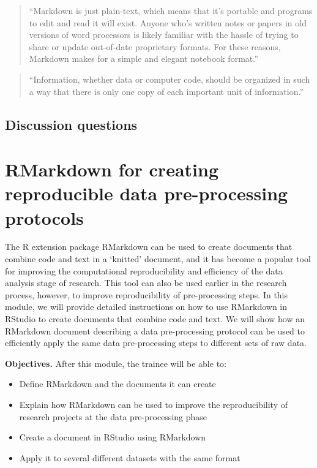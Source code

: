 \documentclass[]{tufte-book}
\providecommand{\tightlist}{%
  \setlength{\itemsep}{0pt}\setlength{\parskip}{0pt}}
\begin{document}
\begin{quote}
``Markdown is just plain-text, which means that it's portable and programs to edit
and read it will exist. Anyone who's written notes or papers in old versions of
word processors is likely familiar with the hassle of trying to share or update
out-of-date proprietary formats. For these reasons, Markdown makes for a simple
and elegant notebook format.'' \citep{buffalo2015bioinformatics}
\end{quote}

\begin{quote}
``Information, whether data or computer code, should be organized in such a way that
there is only one copy of each important unit of information.'' \citep{murrell2009introduction}
\end{quote}

\hypertarget{discussion-questions}{%
\subsection{Discussion questions}\label{discussion-questions}}

\hypertarget{rmarkdown-for-creating-reproducible-data-pre-processing-protocols}{%
\section{RMarkdown for creating reproducible data pre-processing protocols}\label{rmarkdown-for-creating-reproducible-data-pre-processing-protocols}}

The R extension package RMarkdown can be used to create documents that combine
code and text in a `knitted' document, and it has become a popular tool for
improving the computational reproducibility and efficiency of the data analysis
stage of research. This tool can also be used earlier in the research process,
however, to improve reproducibility of pre-processing steps. In this module, we
will provide detailed instructions on how to use RMarkdown in RStudio to create
documents that combine code and text. We will show how an RMarkdown document
describing a data pre-processing protocol can be used to efficiently apply the
same data pre-processing steps to different sets of raw data.

\textbf{Objectives.} After this module, the trainee will be able to:

\begin{itemize}
\tightlist
\item
  Define RMarkdown and the documents it can create
\item
  Explain how RMarkdown can be used to improve the reproducibility of research
  projects at the data pre-processing phase
\item
  Create a document in RStudio using RMarkdown
\item
  Apply it to several different datasets with the same format
\end{itemize}
\end{document}
